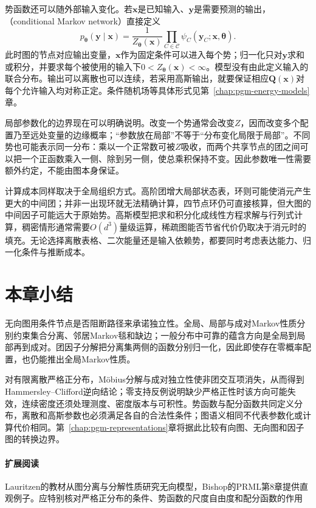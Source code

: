 势函数还可以随外部输入变化。若$\bm{x}$是已知输入、$\bm{y}$是需要预测的输出，（conditional Markov network）直接定义
\begin{equation}
  p_{\bm{\theta}}(\bm{y}\mid\bm{x})
  =\frac{1}{Z_{\bm{\theta}}(\bm{x})}
    \prod_{C\in\mathcal{C}}
    \psi_C(\bm{y}_C;\bm{x},\bm{\theta}).
  \label{eq:pgm-undirected-conditional-network}
\end{equation}
此时图的节点对应输出变量，$\bm{x}$作为固定条件可以进入每个势；归一化只对$\bm{y}$求和或积分，并要求每个被使用的输入下$0<Z_{\bm{\theta}}(\bm{x})<\infty$。模型没有由此定义输入的联合分布。输出可以离散也可以连续，若采用高斯输出，就要保证相应$\bm{Q}(\bm{x})$对每个允许输入均对称正定。条件随机场等具体形式见第~\ref{chap:pgm-energy-models}章。

局部参数化的边界现在可以明确说明。改变一个势通常会改变$Z$，因而改变多个配置乃至远处变量的边缘概率；“参数放在局部”不等于“分布变化局限于局部”。不同势也可能表示同一分布：乘以一个正常数可被$Z$吸收，而两个共享节点的团之间可以把一个正函数乘入一侧、除到另一侧，使总乘积保持不变。因此参数唯一性需要额外约定，不能由图本身保证。

计算成本同样取决于全局组织方式。高阶团增大局部状态表，环则可能使消元产生更大的中间团；并非一出现环就无法精确计算，四节点环仍可直接核算，但大图的中间因子可能远大于原始势。高斯模型把求和积分化成线性方程求解与行列式计算，稠密情形通常需要$O(d^3)$量级运算，稀疏图能否节省代价仍取决于消元时的填充。无论选择离散表格、二次能量还是输入依赖势，都要同时考虑表达能力、归一化条件与推断成本。

\section{本章小结}
\label{sec:pgm-undirected-summary}

无向图用条件节点是否阻断路径来承诺独立性。全局、局部与成对Markov性质分别约束集合分离、邻居Markov毯和缺边；一般分布中可靠的蕴含方向是全局到局部再到成对。团因子分解把分离集两侧的函数分别归一化，因此即使存在零概率配置，也仍能推出全局Markov性质。

对有限离散严格正分布，Möbius分解与成对独立性使非团交互项消失，从而得到Hammersley--Clifford逆向结论；零支持反例说明缺少严格正性时该方向可能失效，连续密度还须处理测度、密度版本与可积性。势函数与配分函数共同定义分布，离散和高斯参数也必须满足各自的合法性条件；图语义相同不代表参数化或计算代价相同。第~\ref{chap:pgm-representations}章将据此比较有向图、无向图和因子图的转换边界。

\paragraph{扩展阅读}
Lauritzen的教材从图分离与分解性质研究无向模型，Bishop的PRML第8章提供直观例子。应特别核对严格正分布的条件、势函数的尺度自由度和配分函数的作用
